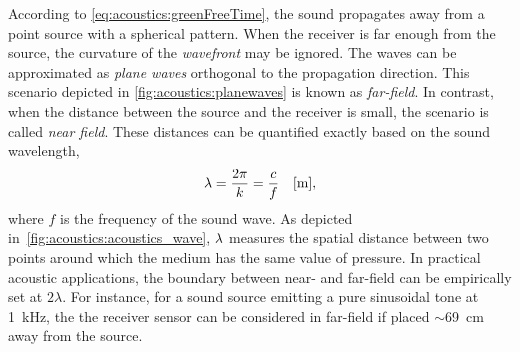 \mynewline
According to \cref{eq:acoustics:greenFreeTime}, the sound propagates away from a point source with a spherical pattern.
When the receiver is far enough from the source, the curvature of the \textit{wavefront} may be ignored.
The waves can be approximated as \textit{plane waves} orthogonal to the propagation direction.
This scenario depicted in \cref{fig:acoustics:planewaves} is known as \textit{far-field}.
In contrast, when the distance between the source and the receiver is small, the scenario is called \textit{near field}.
These distances can be quantified exactly based on the sound wavelength,
\begin{equation}
    \lambda = \frac{2 \pi}{k} = \frac{c}{f} \quad [\si{\metre}]
    ,
\end{equation}
where $f$ is the frequency of the sound wave.
As depicted in~\cref{fig:acoustics:acoustics_wave}, $\lambda$ measures the spatial distance between two points around which the medium has the same value of pressure.
In practical acoustic applications, the boundary between near- and far-field can be empirically set at $2\lambda$.
For instance, for a sound source emitting a pure sinusoidal tone at 1~kHz, the the receiver sensor can be considered in far-field if placed $\sim$69~cm away from the source.

